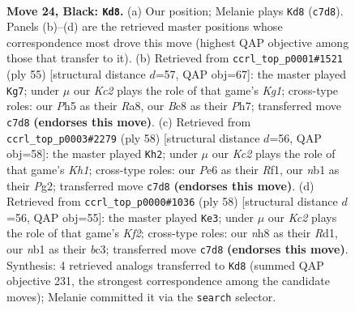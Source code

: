 \documentclass[11pt]{article}
\begin{document}
\clearpage

\begin{figure}[p]\centering
\begin{subfigure}{0.46\textwidth}\centering
\resizebox{\linewidth}{!}{%
\newchessgame
\chessboard[
  setfen={r1b4N/2k5/2p1p1p1/P1b4p/1p3P1P/4P3/3Bn2K/RN6 b - - 5 24},
  showmover=false,
  pgfstyle=straightmove, color=movearrow, markmove={c7-d8}
]}
\caption{}
\end{subfigure}\hfill
\begin{subfigure}{0.46\textwidth}\centering
\resizebox{\linewidth}{!}{%
\newchessgame
\chessboard[
  setfen={r5k1/1p3p1p/1P2b1p1/3pP3/5PP1/3n3P/4N1B1/1R4K1 b - - 0 28},
  showmover=false,
  pgfstyle=straightmove, color=movearrow, markmove={g8-g7}
]}
\caption{}
\end{subfigure}
\\[4pt]
\begin{subfigure}{0.46\textwidth}\centering
\resizebox{\linewidth}{!}{%
\newchessgame
\chessboard[
  setfen={r5k1/ppp5/3pN1pp/3Pn3/2P1B2b/7P/PP4P1/5R1K w - - 3 30},
  showmover=false,
  pgfstyle=straightmove, color=movearrow, markmove={h1-h2}
]}
\caption{}
\end{subfigure}\hfill
\begin{subfigure}{0.46\textwidth}\centering
\resizebox{\linewidth}{!}{%
\newchessgame
\chessboard[
  setfen={5rk1/7p/p3p1p1/1p4N1/3nBP2/1Pb5/P4KPP/3R4 w - - 1 30},
  showmover=false,
  pgfstyle=straightmove, color=movearrow, markmove={f2-e3}
]}
\caption{}
\end{subfigure}
\caption{\textbf{Move 24, Black: \texttt{Kd8}.} (a) Our position; Melanie plays \texttt{Kd8} (\texttt{c7d8}). Panels (b)--(d) are the retrieved master positions whose correspondence most drove this move (highest QAP objective among those that transfer to it). (b) Retrieved from \texttt{ccrl\_top\_p0001\#1521} (ply 55) [structural distance $d$=57, QAP obj=67]: the master played \texttt{Kg7}; under $\mu$ our \emph{Kc2} plays the role of that game's \emph{Kg1}; cross-type roles: our \emph{P}h5 as their \emph{R}a8, our \emph{B}c8 as their \emph{P}h7; transferred move \texttt{c7d8} \textbf{(endorses this move)}. (c) Retrieved from \texttt{ccrl\_top\_p0003\#2279} (ply 58) [structural distance $d$=56, QAP obj=58]: the master played \texttt{Kh2}; under $\mu$ our \emph{Kc2} plays the role of that game's \emph{Kh1}; cross-type roles: our \emph{P}e6 as their \emph{R}f1, our \emph{n}b1 as their \emph{P}g2; transferred move \texttt{c7d8} \textbf{(endorses this move)}. (d) Retrieved from \texttt{ccrl\_top\_p0000\#1036} (ply 58) [structural distance $d$=56, QAP obj=55]: the master played \texttt{Ke3}; under $\mu$ our \emph{Kc2} plays the role of that game's \emph{Kf2}; cross-type roles: our \emph{n}h8 as their \emph{R}d1, our \emph{n}b1 as their \emph{b}c3; transferred move \texttt{c7d8} \textbf{(endorses this move)}. Synthesis: 4 retrieved analogs transferred to \texttt{Kd8} (summed QAP objective 231, the strongest correspondence among the candidate moves); Melanie committed it via the \texttt{search} selector.}
\label{fig:thought-m47}
\end{figure}
\end{document}

